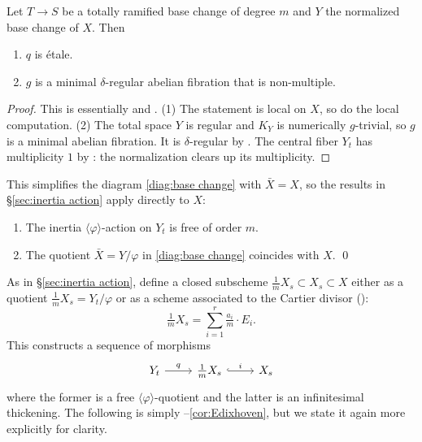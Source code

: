 \documentclass[reqno, letterpaper]{amsart}
\numberwithin{equation}{subsection}
\let\to\longrightarrow
\begin{document}
		\begin{lemma} \label{lem:non-multiple base change}
			Let $T \to S$ be a totally ramified base change of degree $m$ and $Y$ the normalized base change of $X$. Then
			\begin{enumerate}
				\item $q$ is \'etale.
				\item $g$ is a minimal $\delta$-regular abelian fibration that is non-multiple.
			\end{enumerate}
		\end{lemma}
		\begin{proof}
			This is essentially \cite[Proposition~III.9.1]{bar-hulek-pet-van:surface} and \cite[Proposition~3.1]{hwang-ogu11}. (1) The statement is local on $X$, so do the local computation. (2) The total space $Y$ is regular and $K_Y$ is numerically $g$-trivial, so $g$ is a minimal abelian fibration. It is $\delta$-regular by . The central fiber $Y_t$ has multiplicity $1$ by : the normalization clears up its multiplicity.
		\end{proof}
		
		This simplifies the diagram \eqref{diag:base change} with $\bar X = X$, so the results in \S \ref{sec:inertia action} apply directly to $X$:
		
		\begin{corollary}
			\begin{enumerate}
				\item The inertia $\langle \varphi \rangle$-action on $Y_t$ is free of order $m$.
				\item The quotient $\bar X = Y / \varphi$ in \eqref{diag:base change} coincides with $X$. \qed
			\end{enumerate}
		\end{corollary}
		
		As in \S \ref{sec:inertia action}, define a closed subscheme $\frac{1}{m} X_s \subset X_s \subset X$ either as a quotient $\frac{1}{m} X_s = Y_t / \varphi$ or as a scheme associated to the Cartier divisor ():
		\[ \tfrac{1}{m} X_s = \sum_{i=1}^r \tfrac{a_i}{m} \cdot E_i .\]
		This constructs a sequence of morphisms
		\begin{equation} \label{eq:q and i}
		\begin{tikzcd}
			Y_t \arrow[r, "q"] & \tfrac{1}{m}X_s \arrow[r, hookrightarrow, "i"] & X_s
		\end{tikzcd}
		\end{equation}
		where the former is a free $\langle \varphi \rangle$-quotient and the latter is an infinitesimal thickening. The following is simply --\ref{cor:Edixhoven}, but we state it again more explicitly for clarity.
		
\end{document}
